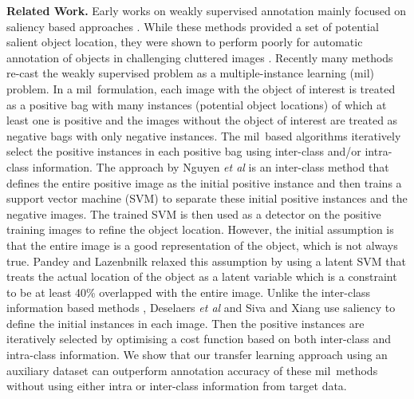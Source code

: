 \documentclass{bmvc2k}
\def\etal{\emph{et al}\bmvaOneDot}
\def\mil{{\sc mil}}
\begin{document}
\noindent \textbf{Related Work.} Early works on weakly supervised annotation mainly focused on saliency based approaches \cite{Alexewhatisobject,Chum07,Russell06}. While these methods provided a set of potential salient object location, they were shown to perform poorly for automatic annotation of objects in challenging cluttered images \cite{Deselaerslocalizing2010}. Recently many methods \cite{Nguyenweakly2011,Deselaerslocalizing2010,Sivaiccv2011} re-cast the weakly supervised problem as a multiple-instance learning (\mil) problem. In a \mil~formulation, each image with the object of interest is treated as a positive bag with many instances (potential object locations) of which at least one is positive and the images without the object of interest are treated as negative bags with only negative instances. The \mil~based algorithms iteratively select the positive instances in each positive bag using inter-class and/or intra-class information. The approach by Nguyen \etal \cite{Nguyenweakly2011} is an inter-class method that defines the entire positive image as the initial positive instance and then trains a support vector machine (SVM) to separate these initial positive instances and the negative images. The trained SVM is then used as a detector on the positive training images to refine the object location. However, the initial assumption is that the entire image is a good representation of the object, which is not always true. Pandey and Lazenbnilk \cite{Pandeyiccv2011} relaxed this assumption by using a latent SVM that treats the actual location of the object as a latent variable which is a constraint to be at least 40\% overlapped with the entire image. Unlike the inter-class information based methods \cite{Nguyenweakly2011,Pandeyiccv2011}, Deselaers \etal \cite{Deselaerslocalizing2010} and Siva and Xiang \cite{Sivaiccv2011} use saliency \cite{Alexewhatisobject} to define the initial instances in each image. Then the positive instances are iteratively selected by optimising a cost function based on both inter-class and intra-class information. We show that our transfer learning approach using an auxiliary dataset can outperform annotation accuracy of these \mil~methods without using either intra or inter-class information from target data. 
\end{document}
